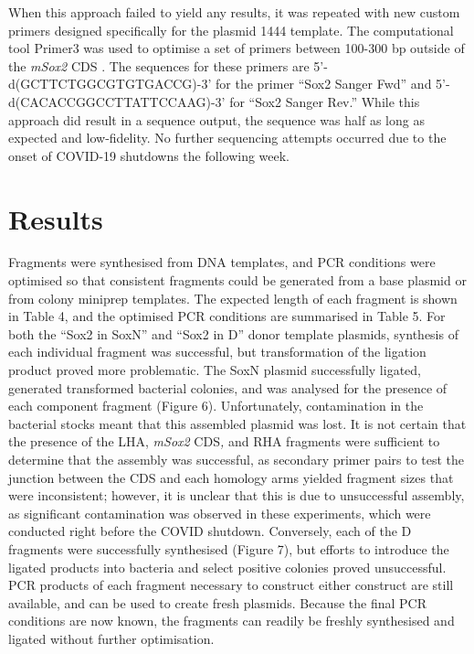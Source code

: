 \documentclass[withindex,glossary]{cam-thesis}
\begin{document}
When this approach failed to yield any results, it was repeated with new
custom primers designed specifically for the plasmid 1444 template. The
computational tool Primer3 was used to optimise a set of primers between
100-300 bp outside of the \emph{mSox2} CDS .
The sequences for these primers are 5'-d(GCTTCTGGCGTGTGACCG)-3' for the
primer ``Sox2 Sanger Fwd'' and 5'-d(CACACCGGCCTTATTCCAAG)-3' for ``Sox2
Sanger Rev.'' While this approach did result in a sequence output, the
sequence was half as long as expected and low-fidelity. No further
sequencing attempts occurred due to the onset of COVID-19 shutdowns the
following week.

\section{Results}

Fragments were synthesised from DNA templates, and PCR conditions were
optimised so that consistent fragments could be generated from a base
plasmid or from colony miniprep templates. The expected length of each
fragment is shown in Table 4, and the optimised PCR conditions are
summarised in Table 5. For both the ``Sox2 in SoxN'' and ``Sox2 in D''
donor template plasmids, synthesis of each individual fragment was
successful, but transformation of the ligation product proved more
problematic. The SoxN plasmid successfully ligated, generated
transformed bacterial colonies, and was analysed for the presence of
each component fragment (Figure 6). Unfortunately, contamination in the
bacterial stocks meant that this assembled plasmid was lost. It is not
certain that the presence of the LHA, \emph{mSox2} CDS\emph{,} and RHA
fragments were sufficient to determine that the assembly was successful,
as secondary primer pairs to test the junction between the CDS and each
homology arms yielded fragment sizes that were inconsistent; however, it
is unclear that this is due to unsuccessful assembly, as significant
contamination was observed in these experiments, which were conducted
right before the COVID shutdown. Conversely, each of the D fragments
were successfully synthesised (Figure 7), but efforts to introduce the
ligated products into bacteria and select positive colonies proved
unsuccessful. PCR products of each fragment necessary to construct
either construct are still available, and can be used to create fresh
plasmids. Because the final PCR conditions are now known, the fragments
can readily be freshly synthesised and ligated without further
optimisation.
\end{document}
